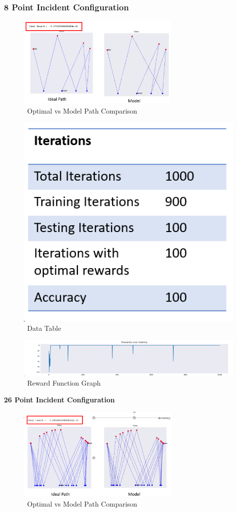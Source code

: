 \documentclass[12pt,a4paper,twoside]{report}
\begin{document}
\subsubsection{8 Point Incident Configuration}

\begin{figure}[h]
	\centering
	\includegraphics[width=0.7\textwidth]{8pt}
	\caption{~Optimal vs Model Path Comparison}
	\label{fig:8pt}
\end{figure}


\begin{figure}[h]
	\centering
	\includegraphics[width=0.3\linewidth]{8table}
	\caption{~Data Table}
	\label{fig:8table}
\end{figure}

\begin{figure}[h]
	\centering
	\includegraphics[width=0.9\linewidth]{8reward}
	\caption{~Reward Function Graph}
	\label{fig:8reward}
\end{figure}



\pagebreak
\justifying
\textbf{26 Point Incident Configuration}

\begin{figure}[h]
	\centering
	\includegraphics[width=0.7\textwidth]{26pt}
	\caption{~Optimal vs Model Path Comparison}
	\label{fig:8pt}
\end{figure}
\end{document}
